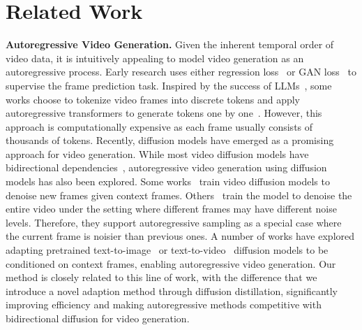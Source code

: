 \section{Related Work}
\label{sec:related}
\noindent\textbf{Autoregressive Video Generation.}
Given the inherent temporal order of video data, it is intuitively appealing to model video generation as an autoregressive process. 
Early research uses either regression loss~\cite{liu2017video,hao2018controllable} or GAN loss~\cite{mathieu2016deep,tulyakov2018mocogan,lee2018stochastic,vondrick2017generating} to supervise the frame prediction task. Inspired by the success of LLMs~\cite{brown2020language}, some works choose to tokenize video frames into discrete tokens and apply autoregressive transformers to generate tokens one by one~\cite{yan2021videogpt,liang2022nuwa,ge2022long,kondratyuk2023videopoet,wu2024vila,wang2024loong}. However, this approach is computationally expensive as each frame usually consists of thousands of tokens.
Recently, diffusion models have emerged as a promising approach for video generation. 
While most video diffusion models have bidirectional dependencies~\cite{opensora,videoworldsimulators2024,yang2024cogvideox,polyak2024movie}, autoregressive video generation using diffusion models has also been explored.
Some works~\cite{zhang2024extdm,valevski2024diffusion,alonso2024diffusion,jin2024pyramidal} train video diffusion models to denoise new frames given context frames.
Others~\cite{ruhe2024rolling,kim2024fifo,chen2024diffusion} train the model to denoise the entire video under the setting where different frames may have different noise levels. Therefore, they support autoregressive sampling as a special case where the current frame is noisier than previous ones.
A number of works have explored adapting pretrained text-to-image~\cite{kodaira2023streamdiffusion,liang2024looking,weng2024art,valevski2024diffusion} or text-to-video~\cite{henschel2024streamingt2v,xing2024live2diff,gao2024vid,xie2024progressive,kim2024fifo} diffusion models to be conditioned on context frames, enabling autoregressive video generation.
Our method is closely related to this line of work, with the difference that we introduce a novel adaption method through diffusion distillation, significantly improving efficiency and making autoregressive methods competitive with bidirectional diffusion for video generation.
\vspace{0.5em}

